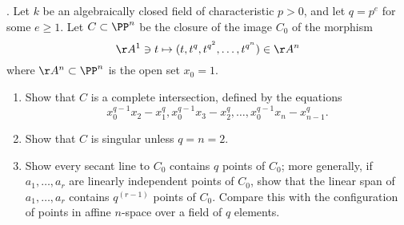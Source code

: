 %
%
%
%
%
%
\begin{exercise}\label{strange curves} \cite{Rathmann}. Let $k$ be an algebraically closed field of characteristic $p>0$, and let $q=p^e$ for some $e\geq 1$. Let $C\subset \PP^n$
be the closure of the image $C_0$ of the morphism
$$
\AA^1 \ni t \mapsto (t, t^q, t^{q^2}, \dots , t^{q^{n}}) \in \AA^n
$$
where $\AA^n\subset \PP^n$ is the open set $x_0=1$. 
\begin{enumerate}
\item Show that $C$ is a complete intersection, defined by the equations
$$
x_0^{q-1}x_2 - x_1^q, x_0^{q-1}x_3 - x_2^q,\dots, 
x_0^{q-1}x_n - x_{n-1}^q.
$$
\item Show that $C$ is singular unless $q = n = 2$.
\item Show every secant line to $C_0$ contains $q$ points of $C_0$; more generally, if
$a_1, \dots, a_r$ are linearly independent points of $C_0$, show that the linear span of
$a_1, \dots, a_r$ contains $q^{(r-1)}$ points of $C_0$.  Compare this with the configuration of
points in affine $n$-space over a field of $q$ elements.
\end{enumerate}
\end{exercise}

